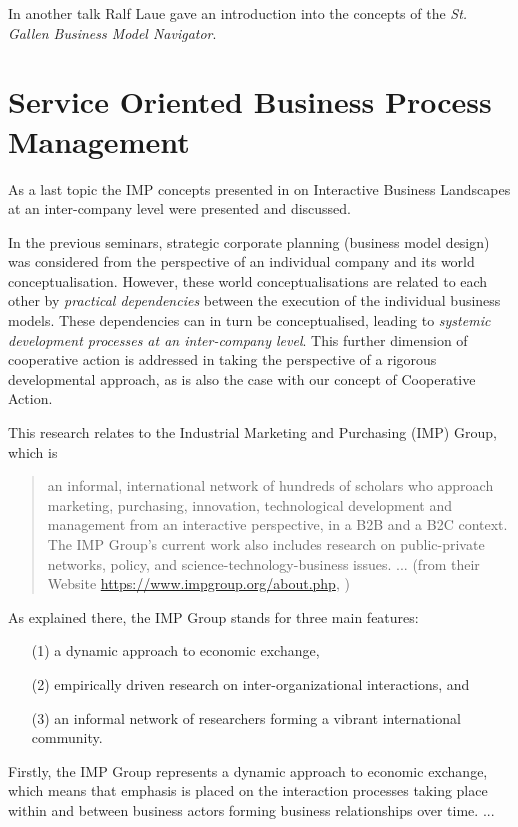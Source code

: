 \documentclass[11pt,a4paper]{article}
\begin{document}
In another talk Ralf Laue gave an introduction into the concepts of the
\emph{St. Gallen Business Model Navigator}.

\section{Service  Oriented Business Process Management}

As a last topic the IMP concepts presented in \cite{FordMouzas2013} on
Interactive Business Landscapes at an inter-company level were presented and
discussed.

In the previous seminars, strategic corporate planning (business model design)
was considered from the perspective of an individual company and its world
conceptualisation. However, these world conceptualisations are related to each
other by \emph{practical dependencies} between the execution of the individual
business models. These dependencies can in turn be conceptualised, leading to
\emph{systemic development processes at an inter-company level}.  This further
dimension of cooperative action is addressed in \cite{FordMouzas2013} taking
the perspective of a rigorous developmental approach, as is also the case with
our concept of Cooperative Action.

This research relates to the Industrial Marketing and Purchasing (IMP) Group,
which is  
\begin{quote}
  an informal, international network of hundreds of scholars who approach
  marketing, purchasing, innovation, technological development and management
  from an interactive perspective, in a B2B and a B2C context. The IMP Group's
  current work also includes research on public-private networks, policy, and
  science-technology-business issues. ... (from their Website
  \url{https://www.impgroup.org/about.php}, )
\end{quote}
As explained there, the IMP Group stands for three main features: 
\begin{itemize}
\item[(1)] a dynamic approach to economic exchange,
\item[(2)] empirically driven research on inter-organizational interactions,
  and
\item[(3)] an informal network of researchers forming a vibrant international
  community.
\end{itemize}
Firstly, the IMP Group represents a dynamic approach to economic exchange,
which means that emphasis is placed on the interaction processes taking place
within and between business actors forming business relationships over time.
...
\end{document}
